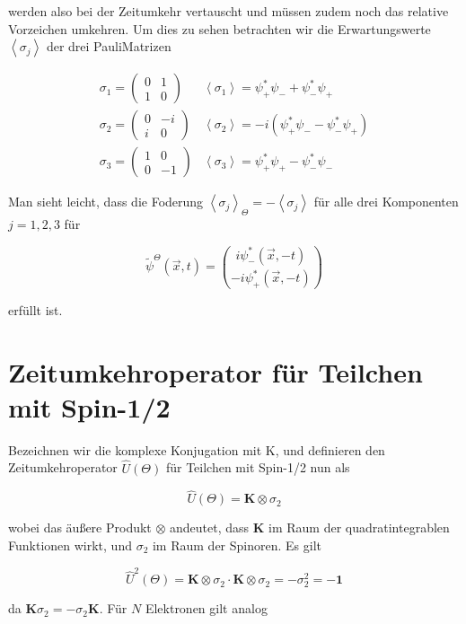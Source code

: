 \documentclass[10pt, letterpaper]{article}
\begin{document}
werden also bei der Zeitumkehr vertauscht und müssen zudem noch das relative Vorzeichen umkehren. Um dies zu sehen betrachten wir die Erwartungswerte $\left\langle\sigma_{j}\right\rangle$ der drei PauliMatrizen

$$
\begin{array}{ll}
\sigma_{1}=\left(\begin{array}{cc}
0 & 1 \\
1 & 0
\end{array}\right) & \left\langle\sigma_{1}\right\rangle=\psi_{+}^{*} \psi_{-}+\psi_{-}^{*} \psi_{+} \\
\sigma_{2}=\left(\begin{array}{cc}
0 & -i \\
i & 0
\end{array}\right) & \left\langle\sigma_{2}\right\rangle=-i\left(\psi_{+}^{*} \psi_{-}-\psi_{-}^{*} \psi_{+}\right) \\
\sigma_{3}=\left(\begin{array}{cc}
1 & 0 \\
0 & -1
\end{array}\right) & \left\langle\sigma_{3}\right\rangle=\psi_{+}^{*} \psi_{+}-\psi_{-}^{*} \psi_{-}
\end{array}
$$

Man sieht leicht, dass die Foderung $\left\langle\sigma_{j}\right\rangle_{\Theta}=-\left\langle\sigma_{j}\right\rangle$ für alle drei Komponenten $j=1,2,3$ für

$$
\widetilde{\psi}^{\Theta}(\vec{x}, t)=\binom{i \psi_{-}^{*}(\vec{x},-t)}{-i \psi_{+}^{*}(\vec{x},-t)}
$$

erfüllt ist.

\section*{Zeitumkehroperator für Teilchen mit Spin-1/2}
Bezeichnen wir die komplexe Konjugation mit K, und definieren den Zeitumkehroperator $\widehat{U}(\Theta)$ für Teilchen mit Spin-1/2 nun als

$$
\widehat{U}(\Theta)=\mathbf{K} \otimes \sigma_{2}
$$

wobei das äußere Produkt $\otimes$ andeutet, dass $\mathbf{K}$ im Raum der quadratintegrablen Funktionen wirkt, und $\sigma_{2}$ im Raum der Spinoren. Es gilt

$$
\widehat{U}^{2}(\Theta)=\mathbf{K} \otimes \sigma_{2} \cdot \mathbf{K} \otimes \sigma_{2}=-\sigma_{2}^{2}=-\mathbf{1}
$$

da $\mathbf{K} \sigma_{2}=-\sigma_{2} \mathbf{K}$. Für $N$ Elektronen gilt analog
\end{document}
